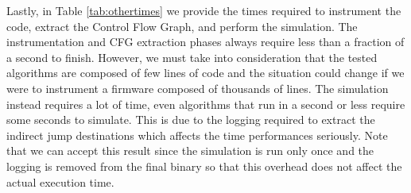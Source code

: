 Lastly, in Table \ref{tab:othertimes} we provide the times required to
instrument the code, extract the Control Flow Graph, and perform the simulation.
The instrumentation and CFG extraction phases always require less than a fraction
of a second to finish. However, we must take into consideration that the tested algorithms
are composed of few lines of code and the situation could change if we were to instrument
a firmware composed of thousands of lines. The simulation instead requires a lot
of time, even algorithms that run in a second or less require some seconds to simulate.
This is due to the logging required to extract the indirect jump destinations
which affects the time performances seriously. Note that we can accept this result
since the simulation is run only once and the logging is removed from the final binary
so that this overhead does not affect the actual execution time.

